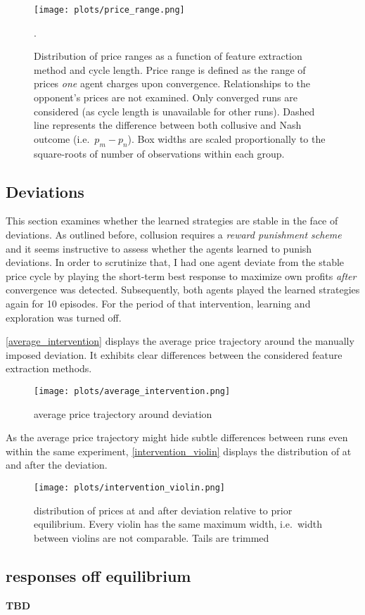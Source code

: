 \begin{figure}
	\texttt{[image: plots/price\_range.png]}
	\caption{Distribution of price ranges as a function of feature extraction method and cycle length. Price range is defined as the range of prices \emph{one} agent charges upon convergence. Relationships to the opponent's prices are not examined. Only converged runs are considered (as cycle length is unavailable for other runs). Dashed line represents the difference between both collusive and Nash outcome (i.e.\ $p_m - p_n$). Box widths are scaled proportionally to the square-roots of number of observations within each group.}.
	\label{price_range}
\end{figure}


\subsection{Deviations}\label{deviations}

This section examines whether the learned strategies are stable in the face of deviations. As outlined before, collusion requires a \emph{reward punishment scheme} and it seems instructive to assess whether the agents learned to punish deviations. In order to scrutinize that, I had one agent deviate from the stable price cycle by playing the short-term best response to maximize own profits \emph{after} convergence was detected. Subsequently, both agents played the learned strategies again for 10 episodes. For the period of that intervention, learning and exploration was turned off.

\autoref{average_intervention} displays the average price trajectory around the manually imposed deviation. It exhibits clear differences between the considered feature extraction methods. 

\begin{figure}
	\texttt{[image: plots/average\_intervention.png]}
	\caption{average price trajectory around deviation}
	\label{average_intervention}
\end{figure}

As the average price trajectory might hide subtle differences between runs even within the same experiment, \autoref{intervention_violin} displays the distribution of at and after the deviation.


\begin{figure}
	\texttt{[image: plots/intervention\_violin.png]}
	\caption{distribution of prices at and after deviation relative to prior equilibrium. Every violin has the same maximum width, i.e.\ width between violins are not comparable. Tails are trimmed}
	\label{intervention_violin}
\end{figure}

\pagebreak
\subsection{responses off equilibrium}

\textbf{TBD}



